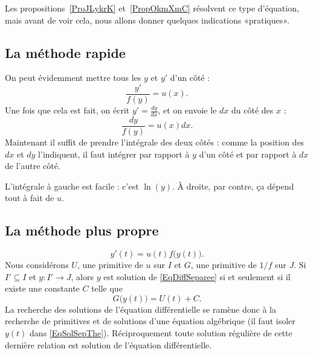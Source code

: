 Les propositions~\ref{ProJLykrK} et~\ref{PropOkmXmC} résolvent ce type d'équation, mais avant de voir cela, nous allons donner quelques indications «pratiques».

\subsection{La méthode rapide}

On peut évidemment mettre tous les \( y\) et \( y'\) d'un côté :
\begin{equation}
	\frac{ y' }{ f(y) }=u(x).
\end{equation}
Une fois que cela est fait, on écrit \( y'=\frac{ dy }{ dx }\), et on envoie le \( dx\) du côté des \( x\) :
\begin{equation}
	\frac{ dy }{ f(y) }=u(x)dx.
\end{equation}
Maintenant il suffit de prendre l'intégrale des deux côtés : comme la position des \( dx\) et \( dy\) l'indiquent, il faut intégrer par rapport à \( y\) d'un côté et par rapport à \( dx\) de l'autre côté.

L'intégrale à gauche est facile : c'est \( \ln(y)\). À droite, par contre, ça dépend tout à fait de \( u\).

\subsection{La méthode plus propre}

\begin{equation}
	y'(t)=u(t)f\big( y(t) \big).
\end{equation}
Nous considérons \( U\), une primitive de \( u\) sur \( I\) et \( G\), une primitive de \( 1/f\) sur \( J\).  Si \( I'\subseteq I\) et \( y\colon I'\to J\), alors \( y\) est solution de \eqref{EqDiffSeparee} si et seulement si il existe une constante \( C\) telle que
\begin{equation}		\label{EqSolSepThe}
	G\big( y(t) \big)=U(t)+C.
\end{equation}
La recherche des solutions de l'équation différentielle se ramène donc à la recherche de primitives et de solutions d'une équation algébrique (il faut isoler \( y(t)\) dans \eqref{EqSolSepThe}). Réciproquement toute solution régulière de cette dernière relation est solution de l'équation différentielle.

